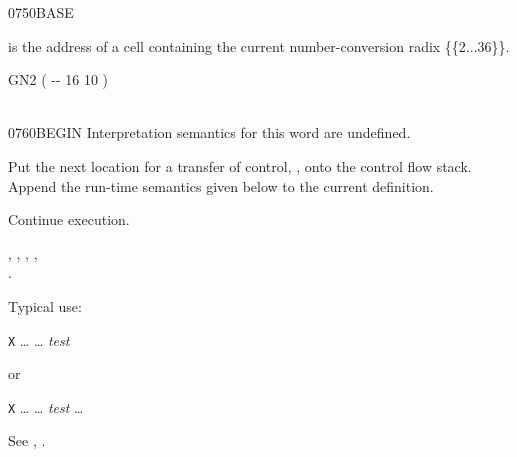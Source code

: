 \begin{worddef}{0750}{BASE}
\item {}

	 is the address of a cell containing the current
	number-conversion radix \{\{2...36\}\}.

	\begin{testing} %
		\ttfamily
		\word{:} GN2	 ( -{}- 16 10 ) \\
		\tab {}  
			  
			  
			  \word{!} \word{;} \\
	\end{testing}
\end{worddef}


\begin{worddef}{0760}{BEGIN}
\interpret
	Interpretation semantics for this word are undefined.

\compile

	Put the next location for a transfer of control, , onto
	the control flow stack. Append the run-time semantics given below
	to the current definition.

\runtime
	\stack{}{}

	Continue execution.

\see {},
	,
	,
	, \\
	.

	\begin{rationale} %
		Typical use:

		\tab \word{:} \texttt{X} {\ldots}
			 {\ldots} \emph{test} 
		\word{;}

		or

		\tab \word{:} \texttt{X} {\ldots}
			 {\ldots}
			\emph{test}  {\ldots}
		\word{;}
	\end{rationale}

	\begin{testing} %
		See ,
			.
	\end{testing}
\end{worddef}


